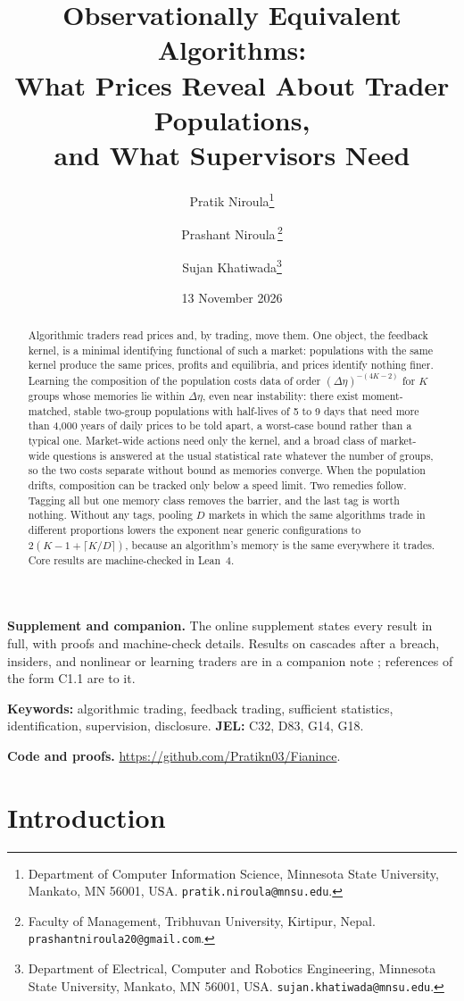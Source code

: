 \documentclass[12pt]{article}
\title{Observationally Equivalent Algorithms:\\ What Prices Reveal About Trader Populations,\\ and What Supervisors Need}
\author{Pratik Niroula\thanks{Department of Computer Information Science, Minnesota State University, Mankato, MN 56001, USA. \texttt{pratik.niroula@mnsu.edu}.}
\and Prashant Niroula\,\thanks{Faculty of Management, Tribhuvan University, Kirtipur, Nepal. \texttt{prashantniroula20@gmail.com}.}
\and Sujan Khatiwada\thanks{Department of Electrical, Computer and Robotics Engineering, Minnesota State University, Mankato, MN 56001, USA. \texttt{sujan.khatiwada@mnsu.edu}.}}
\date{13 November 2026}
\theoremstyle{definition}
\theoremstyle{remark}
\begin{document}
\maketitle
\thispagestyle{empty}\pagestyle{empty}
\begingroup\onehalfspacing

\begin{abstract}
\noindent Algorithmic traders read prices and, by trading, move them. One object, the feedback kernel, is a minimal identifying functional of such a market: populations with the same kernel produce the same prices, profits and equilibria, and prices identify nothing finer. Learning the composition of the population costs data of order $(\Delta\eta)^{-(4K-2)}$ for $K$ groups whose memories lie within $\Delta\eta$, even near instability: there exist moment-matched, stable two-group populations with half-lives of 5 to 9 days that need more than 4{,}000 years of daily prices to be told apart, a worst-case bound rather than a typical one. Market-wide actions need only the kernel, and a broad class of market-wide questions is answered at the usual statistical rate whatever the number of groups, so the two costs separate without bound as memories converge. When the population drifts, composition can be tracked only below a speed limit. Two remedies follow. Tagging all but one memory class removes the barrier, and the last tag is worth nothing. Without any tags, pooling $D$ markets in which the same algorithms trade in different proportions lowers the exponent near generic configurations to $2(K-1+\lceil K/D\rceil)$, because an algorithm's memory is the same everywhere it trades. Core results are machine-checked in Lean~4.
\end{abstract}

\noindent\textbf{Supplement and companion.} The online supplement states every result in full, with proofs and machine-check details. Results on cascades after a breach, insiders, and nonlinear or learning traders are in a companion note \citep{niroula2026c}; references of the form C1.1 are to it.

\noindent\textbf{Keywords:} algorithmic trading, feedback trading, sufficient statistics, identification, supervision, disclosure. \textbf{JEL:} C32, D83, G14, G18.

\noindent\textbf{Code and proofs.} \url{https://github.com/Pratikn03/Fianince}.

\endgroup
\newpage
\pagestyle{fancy}
\setcounter{page}{1}

\section{Introduction}\label{n:intro}
\end{document}
